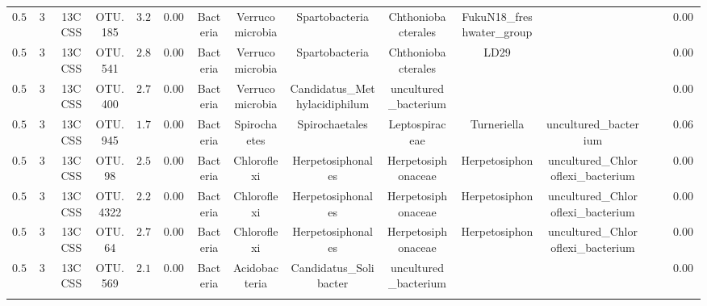\begin{table}[!htbp]
\begin{tabular}{@{\extracolsep{5pt}} ccccccccccccccc}
$0.550$ & $30$ & 13CCSS & OTU.185 & $3.264$ & $0.00000$ & Bacteria & Verrucomicrobia & Spartobacteria & Chthoniobacterales & FukuN18\_freshwater\_group &  &  &  & $0.00001$ \\ 
$0.550$ & $30$ & 13CCSS & OTU.541 & $2.848$ & $0.00000$ & Bacteria & Verrucomicrobia & Spartobacteria & Chthoniobacterales & LD29 &  &  &  & $0.0002$ \\ 
$0.550$ & $30$ & 13CCSS & OTU.400 & $2.755$ & $0.00001$ & Bacteria & Verrucomicrobia & Candidatus\_Methylacidiphilum & uncultured\_bacterium &  &  &  &  & $0.001$ \\ 
$0.550$ & $30$ & 13CCSS & OTU.945 & $1.713$ & $0.003$ & Bacteria & Spirochaetes & Spirochaetales & Leptospiraceae & Turneriella & uncultured\_bacterium &  &  & $0.069$ \\ 
$0.550$ & $30$ & 13CCSS & OTU.98 & $2.558$ & $0.00003$ & Bacteria & Chloroflexi & Herpetosiphonales & Herpetosiphonaceae & Herpetosiphon & uncultured\_Chloroflexi\_bacterium &  &  & $0.002$ \\ 
$0.550$ & $30$ & 13CCSS & OTU.4322 & $2.264$ & $0.0002$ & Bacteria & Chloroflexi & Herpetosiphonales & Herpetosiphonaceae & Herpetosiphon & uncultured\_Chloroflexi\_bacterium &  &  & $0.007$ \\ 
$0.550$ & $30$ & 13CCSS & OTU.64 & $2.781$ & $0.00000$ & Bacteria & Chloroflexi & Herpetosiphonales & Herpetosiphonaceae & Herpetosiphon & uncultured\_Chloroflexi\_bacterium &  &  & $0.0001$ \\ 
$0.550$ & $30$ & 13CCSS & OTU.569 & $2.152$ & $0.0002$ & Bacteria & Acidobacteria & Candidatus\_Solibacter & uncultured\_bacterium &  &  &  &  & $0.006$ \\ 
\hline \\[-1.8ex] 
\end{tabular} 
\end{table} 
